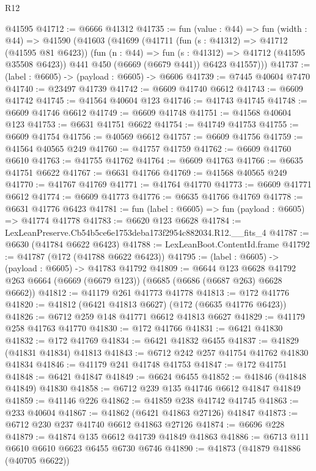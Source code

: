 \begin{lexlean}{R12}
\begin{coremodule}
    @41595
@41712 := @6666 @41312
@41735 := fun (value : @44) =>
  fun (width : @44) =>
  @41590
    (@41603
      (@41699
        (@41711
          (fun (s : @41312) => @41712 (@41595 @81 @6423))
          (fun (n : @44) => fun (s : @41312) => @41712 (@41595 @35508 @6423))
          @441
          @450
          (@6669 (@6679 @441))
          @6423
          @41557)))
@41737 := (label : @6605) -> (payload : @6605) -> @6606
@41739 := @7445 @40604 @7470
@41740 := @23497 @41739
@41742 := @6609 @41740 @6612
@41743 := @6609 @41742
@41745 := @41564 @40604 @123
@41746 := @41743 @41745
@41748 := @6609 @41746 @6612
@41749 := @6609 @41748
@41751 := @41568 @40604 @123
@41753 := @6631 @41751 @6622
@41754 := @41749 @41753
@41755 := @6609 @41754
@41756 := @40569 @6612
@41757 := @6609 @41756
@41759 := @41564 @40565 @249
@41760 := @41757 @41759
@41762 := @6609 @41760 @6610
@41763 := @41755 @41762
@41764 := @6609 @41763
@41766 := @6635 @41751 @6622
@41767 := @6631 @41766
@41769 := @41568 @40565 @249
@41770 := @41767 @41769
@41771 := @41764 @41770
@41773 := @6609 @41771 @6612
@41774 := @6609 @41773
@41776 := @6635 @41766 @41769
@41778 := @6631 @41776 @6423
@41781 := fun (label : @6605) => fun (payload : @6605) => @41774 @41778
@41783 := @6620 @123 @6628
@41784 := LexLeanPreserve.Cb54b5ce6e1753deba173f2954c882034.R12.__fits_4
@41787 := @6630 (@41784 @6622 @6423)
@41788 := LexLeanBoot.ContentId.frame
@41792 := @41787 (@172 (@41788 @6622 @6423))
@41795 := (label : @6605) -> (payload : @6605) -> @41783 @41792
@41809 := @6644
    @123
    @6628
    @41792
    @263
    @6664
    (@6669 (@6679 @123))
    (@6685 (@6686 (@6687 @263) @6628 @6662))
@41812 := @41179 @261 @41773 @41778
@41813 := @172 @41776
@41820 := @41812 (@6421 @41813 @6627) (@172 (@6635 @41776 @6423))
@41826 := @6712 @259 @148 @41771 @6612 @41813 @6627
@41829 := @41179 @258 @41763 @41770
@41830 := @172 @41766
@41831 := @6421 @41830
@41832 := @172 @41769
@41834 := @6421 @41832 @6455
@41837 := @41829 (@41831 @41834) @41813
@41843 := @6712 @242 @257 @41754 @41762 @41830 @41834
@41846 := @41179 @241 @41748 @41753
@41847 := @172 @41751
@41848 := @6421 @41847
@41849 := @6624 @6455
@41852 := @41846 (@41848 @41849) @41830
@41858 := @6712 @239 @135 @41746 @6612 @41847 @41849
@41859 := @41146 @226
@41862 := @41859 @238 @41742 @41745
@41863 := @233 @40604
@41867 := @41862 (@6421 @41863 @27126) @41847
@41873 := @6712 @230 @237 @41740 @6612 @41863 @27126
@41874 := @6696 @228
@41879 := @41874 @135 @6612 @41739 @41849 @41863
@41886 := @6713 @111 @6610 @6610 @6623 @6455 @6730 @6746
@41890 := @41873 (@41879 @41886 (@40705 @6622))

\end{coremodule}
\end{lexlean}

